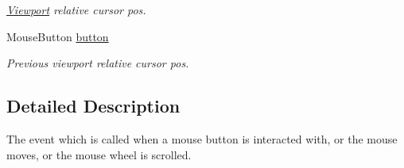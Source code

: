 \begin{DoxyCompactItemize}
\begin{DoxyCompactList}\small\item\em \hyperlink{class_viewport}{Viewport} relative cursor pos. \end{DoxyCompactList}\item 
\hypertarget{struct_mouse_event_a26b9a03c639a856e34c2d8bec26ce611}{Mouse\-Button \hyperlink{struct_mouse_event_a26b9a03c639a856e34c2d8bec26ce611}{button}}\label{struct_mouse_event_a26b9a03c639a856e34c2d8bec26ce611}

\begin{DoxyCompactList}\small\item\em Previous viewport relative cursor pos. \end{DoxyCompactList}\end{DoxyCompactItemize}


\subsection{Detailed Description}
The event which is called when a mouse button is interacted with, or the mouse moves, or the mouse wheel is scrolled. 

